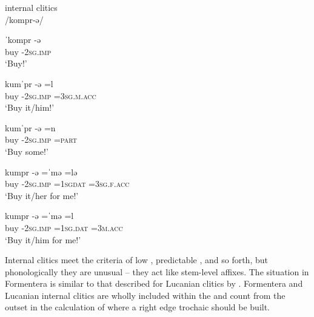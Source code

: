 \documentclass[output=paper,
modfonts
]{LSP/langsci}
\begin{document}
\ea \label{ex:kaisse:5}   \citep{torres-Tamarit2015} internal clitics\\
/kompr-ə/ 

	\ea \label{ex:kaisse:5a}	\gll ˈkompr \squish-ə  \\
		buy \squish-\textsc{2sg.imp}\\
		\glt `Buy!'

	\ex \label{ex:kaisse:5b}	\gll kumˈpr \squish-ə  \squish=l\\
		buy \squish-\textsc{2sg.imp} \squish=\textsc{3sg.m.acc}\\
		\glt `Buy it/him!'

	\ex \label{ex:kaisse:5c}	\gll kumˈpr \squish-ə  \squish=n\\ 
		buy \squish-\textsc{2sg.imp} \squish\textsc{=part}\\
		\glt `Buy some!'

	\ex \label{ex:kaisse:5d}	\gll kumpr \squish-ə \squish=ˈmə \squish=lə \\
		buy \squish\textsc{-2sg.imp} \squish\textsc{=1sgdat} \squish\textsc{=3sg.f.acc}\\
		\glt `Buy it/her for me!'

	\ex \label{ex:kaisse:5e}	\gll kumpr \squish-ə  \squish=ˈmə  \squish=l\\ 
		buy \squish-\textsc{2sg.imp} \squish\textsc{=1sg.dat} \squish\textsc{=3m.acc}\\
		\glt `Buy it/him for me!'
	\z
\z

\noindent Internal clitics meet the criteria of low , predictable , and so forth, but phonologically they are unusual -- they act like stem-level affixes. The situation in Formentera is similar to that described for Lucanian  clitics by \citet{peperkamp1997}. Formentera and Lucanian internal clitics are wholly included within the  and count from the outset in the calculation of where a right edge trochaic  should be built.
\end{document}
